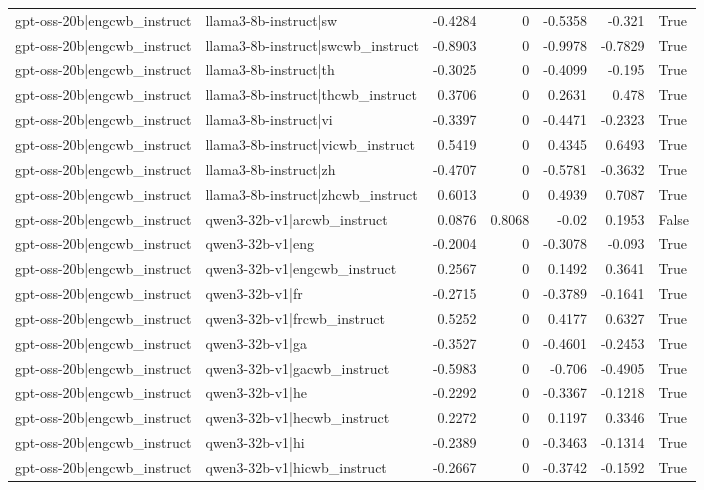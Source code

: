 \begin{table}
\begin{tabular}{l l r r r r l}
gpt-oss-20b|engcwb_instruct & llama3-8b-instruct|sw & -0.4284 & 0 & -0.5358 & -0.321 & True \\
gpt-oss-20b|engcwb_instruct & llama3-8b-instruct|swcwb_instruct & -0.8903 & 0 & -0.9978 & -0.7829 & True \\
gpt-oss-20b|engcwb_instruct & llama3-8b-instruct|th & -0.3025 & 0 & -0.4099 & -0.195 & True \\
gpt-oss-20b|engcwb_instruct & llama3-8b-instruct|thcwb_instruct & 0.3706 & 0 & 0.2631 & 0.478 & True \\
gpt-oss-20b|engcwb_instruct & llama3-8b-instruct|vi & -0.3397 & 0 & -0.4471 & -0.2323 & True \\
gpt-oss-20b|engcwb_instruct & llama3-8b-instruct|vicwb_instruct & 0.5419 & 0 & 0.4345 & 0.6493 & True \\
gpt-oss-20b|engcwb_instruct & llama3-8b-instruct|zh & -0.4707 & 0 & -0.5781 & -0.3632 & True \\
gpt-oss-20b|engcwb_instruct & llama3-8b-instruct|zhcwb_instruct & 0.6013 & 0 & 0.4939 & 0.7087 & True \\
gpt-oss-20b|engcwb_instruct & qwen3-32b-v1|arcwb_instruct & 0.0876 & 0.8068 & -0.02 & 0.1953 & False \\
gpt-oss-20b|engcwb_instruct & qwen3-32b-v1|eng & -0.2004 & 0 & -0.3078 & -0.093 & True \\
gpt-oss-20b|engcwb_instruct & qwen3-32b-v1|engcwb_instruct & 0.2567 & 0 & 0.1492 & 0.3641 & True \\
gpt-oss-20b|engcwb_instruct & qwen3-32b-v1|fr & -0.2715 & 0 & -0.3789 & -0.1641 & True \\
gpt-oss-20b|engcwb_instruct & qwen3-32b-v1|frcwb_instruct & 0.5252 & 0 & 0.4177 & 0.6327 & True \\
gpt-oss-20b|engcwb_instruct & qwen3-32b-v1|ga & -0.3527 & 0 & -0.4601 & -0.2453 & True \\
gpt-oss-20b|engcwb_instruct & qwen3-32b-v1|gacwb_instruct & -0.5983 & 0 & -0.706 & -0.4905 & True \\
gpt-oss-20b|engcwb_instruct & qwen3-32b-v1|he & -0.2292 & 0 & -0.3367 & -0.1218 & True \\
gpt-oss-20b|engcwb_instruct & qwen3-32b-v1|hecwb_instruct & 0.2272 & 0 & 0.1197 & 0.3346 & True \\
gpt-oss-20b|engcwb_instruct & qwen3-32b-v1|hi & -0.2389 & 0 & -0.3463 & -0.1314 & True \\
gpt-oss-20b|engcwb_instruct & qwen3-32b-v1|hicwb_instruct & -0.2667 & 0 & -0.3742 & -0.1592 & True \\

\end{tabular}
\end{table}
